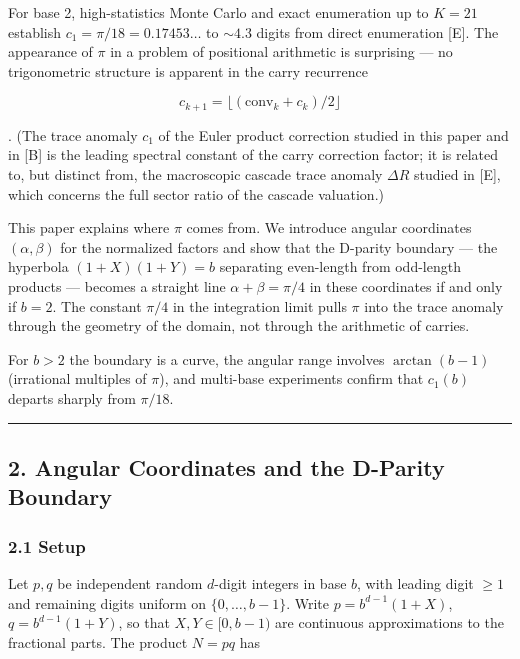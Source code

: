 \documentclass[
  11pt,
]{article}
\begin{document}
For base 2, high-statistics Monte Carlo and exact enumeration up to \(K = 21\)
establish \(c_1 = \pi/18 = 0.17453\ldots\) to \({\sim}4.3\) digits from direct
enumeration {[}E{]}. The appearance of \(\pi\) in a problem of positional
arithmetic is surprising --- no trigonometric structure is apparent in the carry
recurrence

\[c_{k+1} = \lfloor(\mathrm{conv}_k + c_k)/2\rfloor\]

. (The trace anomaly \(c_1\) of the Euler product correction studied in this
paper and in {[}B{]} is the leading spectral constant of the carry correction
factor; it is related to, but distinct from, the macroscopic cascade trace
anomaly \(\Delta R\) studied in {[}E{]}, which concerns the full sector ratio of
the cascade valuation.)

This paper explains where \(\pi\) comes from. We introduce angular coordinates
\((\alpha, \beta)\) for the normalized factors and show that the D-parity
boundary --- the hyperbola \((1+X)(1+Y) = b\) separating even-length from
odd-length products --- becomes a straight line \(\alpha + \beta = \pi/4\) in
these coordinates if and only if \(b = 2\). The constant \(\pi/4\) in the
integration limit pulls \(\pi\) into the trace anomaly through the geometry of
the domain, not through the arithmetic of carries.

For \(b > 2\) the boundary is a curve, the angular range involves
\(\arctan(b-1)\) (irrational multiples of \(\pi\)), and multi-base experiments
confirm that \(c_1(b)\) departs sharply from \(\pi/18\).

\begin{center}\rule{0.5\linewidth}{0.5pt}\end{center}

\newpage

\subsection{2. Angular Coordinates and the D-Parity
Boundary}\label{angular-coordinates-and-the-d-parity-boundary}

\subsubsection{2.1 Setup}\label{setup}

Let \(p, q\) be independent random \(d\)-digit integers in base \(b\), with
leading digit \(\geq 1\) and remaining digits uniform on
\(\lbrace{}0, \ldots, b-1\rbrace{}\). Write \(p = b^{d-1}(1+X)\),
\(q = b^{d-1}(1+Y)\), so that \(X, Y \in [0, b-1)\) are continuous
approximations to the fractional parts. The product \(N = pq\) has
\end{document}
